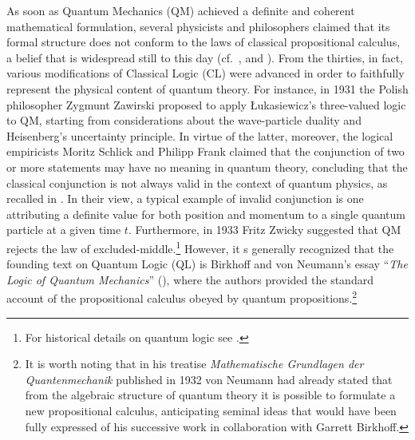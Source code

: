 \documentclass[11pt, executivepaper]{article}
\begin{document}
As soon as Quantum Mechanics (QM) achieved a definite and coherent mathematical formulation, several physicists and philosophers claimed that its formal structure does not conform to the laws of classical propositional calculus, a belief that is widespread still to this day (cf.\ \cite{Giuntini:2002}, \cite{DallaChiara:2004} and \cite{deRonde:2016}). From the thirties, in fact, various modifications of Classical Logic (CL) were advanced in order to faithfully represent the physical content of quantum theory. For instance, in 1931 the Polish philosopher Zygmunt Zawirski proposed to apply \L ukasiewicz's three-valued logic to QM, starting from considerations about the wave-particle duality and Heisenberg's uncertainty principle. In virtue of the latter, moreover, the logical empiricists Moritz Schlick and Philipp Frank claimed that the conjunction of two or more statements may have no meaning in quantum theory, concluding that the classical conjunction is not always valid in the context of quantum physics, as recalled in \cite{Carnap:1966}. In their view, a typical example of invalid conjunction is one attributing a definite value for both position and momentum to a single quantum particle at a given time $t$. Furthermore, in 1933 Fritz Zwicky suggested that QM rejects the law of excluded-middle.\footnote{For historical details on quantum logic see \cite{Jammer:1974}.} However, it s generally recognized that 
the founding text on Quantum Logic (QL) is Birkhoff and von Neumann's essay ``\emph{The Logic of Quantum Mechanics}'' (\cite{vonNeumann:1936}), where the authors provided the standard account of the propositional calculus obeyed by quantum propositions.\footnote{It is worth noting that in his treatise \emph{Mathematische Grundlagen der Quantenmechanik} published in 1932 von Neumann had already stated that from the algebraic structure of quantum theory it is possible to formulate a new propositional calculus, anticipating seminal ideas that would have been fully expressed of his successive work in collaboration with Garrett Birkhoff.}
\end{document}
